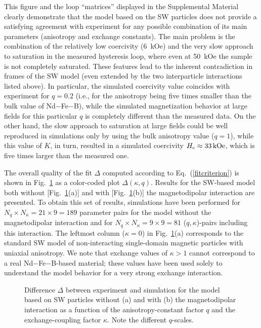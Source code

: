 \documentclass[prm,twocolumn,showkeys,preprintnumbers,amsmath,amssymb,superscriptaddress,aps,10pt]{revtex4-1}
\begin{document}
This figure and the loop ``matrices'' displayed in the Supplemental Material clearly demonstrate that the model based on the SW particles does not provide a satisfying agreement with experiment for any possible combination of its main parameters (anisotropy and exchange constants). The main problem is the combination of the relatively low coercivity (6~kOe) and the very slow approach to saturation in the measured hysteresis loop, where even at 50~kOe the sample is not completely saturated. These features lead to the inherent contradiction in frames of the SW model (even extended by the two interparticle interactions listed above). In particular, the simulated coercivity value coincides with experiment for $q = 0.2$ (i.e., for the anisotropy being five times smaller than the bulk value of Nd$-$Fe$-$B), while the simulated magnetization behavior at large fields for this particular $q$ is completely different than the measured data. On the other hand, the slow approach to saturation at large fields could be well reproduced in simulations only by using the bulk anisotropy value ($q = 1$), while this value of $K$, in turn, resulted in a simulated coercivity $H_{\rm c} \approx 33 \, {\rm kOe}$, which is five times larger than the measured one.

The overall quality of the fit $\Delta$ computed according to Eq.~(\ref{fitcriterion}) is shown in Fig.~\ref{DeltaSWboth} as a color-coded plot $\Delta(\kappa, q)$. Results for the SW-based model both without [Fig.~\ref{DeltaSWboth}(a)] and with [Fig.~\ref{DeltaSWboth}(b)] the magnetodipolar interaction are presented. To obtain this set of results, simulations have been performed for $N_q \times N_\kappa = 21 \times 9 = 189$ parameter pairs for the model without the magnetodipolar interaction and for $N_q \times N_\kappa = 9 \times 9 = 81$ ($q, \kappa$)-pairs including this interaction. The leftmost column ($\kappa = 0$) in Fig.~\ref{DeltaSWboth}(a) corresponds to the standard SW model of non-interacting single-domain magnetic particles with uniaxial anisotropy. We note that exchange values of $\kappa > 1$ cannot correspond to a real Nd$-$Fe$-$B-based material; these values have been used solely to understand the model behavior for a very strong exchange interaction. 
\begin{figure}[htb]
\centering
{}
\caption{Difference $\Delta$ between experiment and simulation for the model based on SW particles without (a) and with (b) the magnetodipolar interaction as a function of the anisotropy-constant factor $q$ and the exchange-coupling factor $\kappa$. Note the different $q$-scales.}
\label{DeltaSWboth}
\end{figure}
\end{document}
